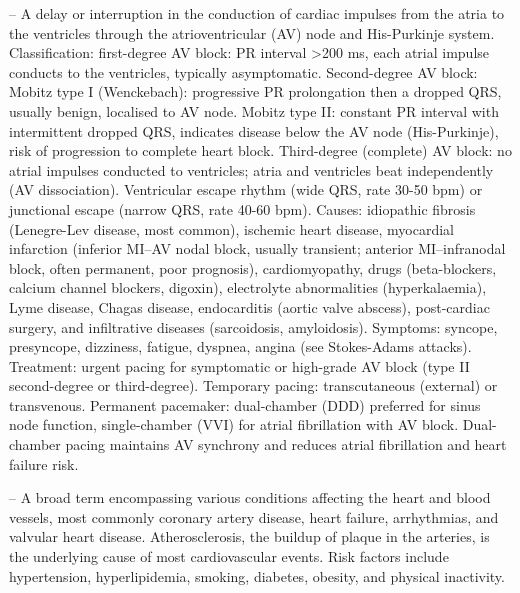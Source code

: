 -- A delay or interruption in the conduction of cardiac impulses from the atria to the ventricles through the atrioventricular (AV) node and His-Purkinje system. Classification: first-degree AV block: PR interval >200 ms, each atrial impulse conducts to the ventricles, typically asymptomatic. Second-degree AV block: Mobitz type I (Wenckebach): progressive PR prolongation then a dropped QRS, usually benign, localised to AV node. Mobitz type II: constant PR interval with intermittent dropped QRS, indicates disease below the AV node (His-Purkinje), risk of progression to complete heart block. Third-degree (complete) AV block: no atrial impulses conducted to ventricles; atria and ventricles beat independently (AV dissociation). Ventricular escape rhythm (wide QRS, rate 30-50 bpm) or junctional escape (narrow QRS, rate 40-60 bpm). Causes: idiopathic fibrosis (Lenegre-Lev disease, most common), ischemic heart disease, myocardial infarction (inferior MI--AV nodal block, usually transient; anterior MI--infranodal block, often permanent, poor prognosis), cardiomyopathy, drugs (beta-blockers, calcium channel blockers, digoxin), electrolyte abnormalities (hyperkalaemia), Lyme disease, Chagas disease, endocarditis (aortic valve abscess), post-cardiac surgery, and infiltrative diseases (sarcoidosis, amyloidosis). Symptoms: syncope, presyncope, dizziness, fatigue, dyspnea, angina (see Stokes-Adams attacks). Treatment: urgent pacing for symptomatic or high-grade AV block (type II second-degree or third-degree). Temporary pacing: transcutaneous (external) or transvenous. Permanent pacemaker: dual-chamber (DDD) preferred for sinus node function, single-chamber (VVI) for atrial fibrillation with AV block. Dual-chamber pacing maintains AV synchrony and reduces atrial fibrillation and heart failure risk.

-- A broad term encompassing various conditions affecting the heart and blood vessels, most commonly coronary artery disease, heart failure, arrhythmias, and valvular heart disease. Atherosclerosis, the buildup of plaque in the arteries, is the underlying cause of most cardiovascular events. Risk factors include hypertension, hyperlipidemia, smoking, diabetes, obesity, and physical inactivity.

